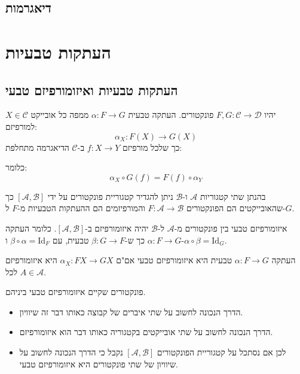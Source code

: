 \documentclass{tstextbook}
\begin{document}
\section{דיאגרמות}

\chapter{העתקות טבעיות}

\section{העתקות טבעיות ואיזומורפיזם טבעי}

\begin{definition}
יהיו \(F,G:\mathcal{C}\to \mathcal{D}\) פונקטורים. העתקה טבעית \(\alpha:F\to G\) ממפה כל אובייקט \(X \in \mathcal{C}\) למורפיזם:
$$\alpha_{X}:F(X)\to G(X)$$
כך שלכל מורפיזם \(f:X\to Y\) ב-\(\mathcal{C}\) הדיאגרמה מתחלפת:

\end{definition}
כלומר:
$$\alpha_{X}\circ  G(f)=F(f)\circ  \alpha_{Y}$$

\begin{definition}
בהנתן שתי קטגוריות \(\mathcal{A}\) ו-\(\mathcal{B}\) ניתן להגדיר קטגוריית פונקטורים על ידי \([\mathcal{A},\mathcal{B}]\) כך שהאובייקטים הם הפונקטורים \(F:\mathcal{A}\to \mathcal{B}\) והמורפיזמים הם ההעתקות הטבעיות מ-\(F\) ל-\(G\).

\end{definition}
\begin{definition}
איזומורפיזם טבעי בין פונקטורים מ-\(\mathcal{A}\) ל-\(\mathcal{B}\) יהיה איזומורפיזם ב-\([\mathcal{A},\mathcal{B}]\). כלומר העתקה \(\alpha:F\to G\) כך ש-\(\beta:G\to F\) טבעית, עם \(\beta \circ \alpha = \mathrm{Id}_{F}\) ו-\(\alpha \circ \beta = \mathrm{Id}_{G}\).

\end{definition}
\begin{proposition}
העתקה \(\alpha:F\to G\) טבעית היא איזומורפיזם טבעי אם"ם \(\alpha_{X}:FX\to GX\) היא איזומורפיזם לכל \(A \in \mathcal{A}\).

\end{proposition}
\begin{definition}
פונקטורים שקיים איזומורפיזם טבעי ביניהם.

\end{definition}
\begin{remark}
  \begin{itemize}
    \item הדרך הנכונה לחשוב על שתי איברים של קבוצה כאותו דבר זה שיוויון.
    \item הדרך הנכונה לחשוב על שתי אובייקטים בקטגוריה כאותו דבר הוא איזומורפיזם.
    \item לכן אם נסתכל על קטגוריית הפונקטורים \([\mathcal{A},\mathcal{B}]\) נקבל כי הדרך הנכונה לחשוב על שיוויון של שתי פונקטורים היא איזומורפיזם טבעי.
  \end{itemize}
\end{remark}
\end{document}
